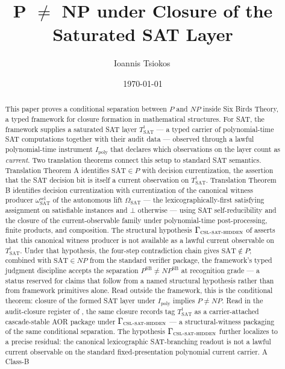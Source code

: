 \documentclass[11pt]{article}
\title{P $\neq$ NP under Closure of the Saturated SAT Layer}
\author{Ioannis Tsiokos\,\orcidlink{0009-0009-7659-5964}}
\date{\today}
\newcommand{\Tsat}{T^{!}_{\mathrm{SAT}}}
\newcommand{\Ipoly}{I_{\mathrm{poly}}}
\newcommand{\OmegaSAT}{\Omega_{\mathrm{SAT}}}
\newcommand{\CSLSATHidden}{\Gamma_{\textsc{csl-sat-hidden}}}
\newcommand{\PSB}{P^{\mathrm{SB}}}
\newcommand{\NPSB}{NP^{\mathrm{SB}}}
\theoremstyle{definition}
\begin{document}
\maketitle
\thispagestyle{firstpage}

\begin{abstract}
This paper proves a conditional separation between \(P\) and \(NP\)
inside Six Birds Theory, a typed framework for closure formation in
mathematical structures.  For SAT, the framework supplies a saturated
SAT layer \(\Tsat\) --- a typed carrier of polynomial-time SAT
computations together with their audit data --- observed through a
lawful polynomial-time instrument \(\Ipoly\) that declares which
observations on the layer count as \emph{current}.  Two translation
theorems connect this setup to standard SAT semantics.  Translation
Theorem A identifies \(\mathrm{SAT}\in P\) with decision
currentization, the assertion that the SAT decision bit is itself a
current observation on \(\Tsat\).  Translation Theorem B identifies
decision currentization with currentization of the canonical
witness producer \(\omega_{\mathrm{SAT}}^{\mathrm{sel}}\) of the
autonomous lift \(\OmegaSAT\) --- the lexicographically-first
satisfying assignment on satisfiable instances and \(\bot\) otherwise
--- using SAT self-reducibility and the closure of the
current-observable family under polynomial-time post-processing,
finite products, and composition.  The structural hypothesis
\(\CSLSATHidden\) of \citet{TsiokosHiddenness2026} asserts that this
canonical witness producer is not available as a lawful current
observable on \(\Tsat\).  Under that
hypothesis, the four-step contradiction chain gives
\(\mathrm{SAT}\notin P\); combined with \(\mathrm{SAT}\in NP\) from
the standard verifier package, the framework's typed judgment
discipline accepts the separation \(\PSB\neq\NPSB\) at recognition
grade --- a status reserved for claims that follow from a named
structural hypothesis rather than from framework primitives alone.
Read outside the framework, this is the conditional theorem: closure
of the formed SAT layer under \(\Ipoly\) implies \(P\neq NP\).  Read
in the audit-closure register of \citet{Tsiokos2026AOR}, the same
closure records tag \(\Tsat\) as a carrier-attached cascade-stable
AOR package under \(\CSLSATHidden\) --- a structural-witness
packaging of the same conditional separation.  The hypothesis \(\CSLSATHidden\) further
localizes to a precise residual: the canonical lexicographic
SAT-branching readout is not a lawful current observable on the
standard fixed-presentation polynomial current carrier.  A Class-B

\end{abstract}
\end{document}
